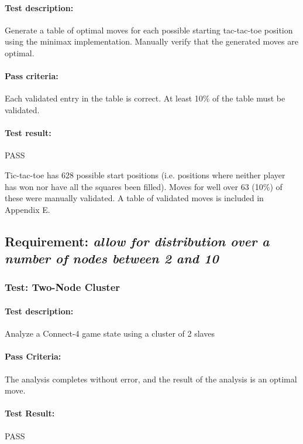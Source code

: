 \documentclass[pdftex,12pt,a4paper]{article}
\begin{document}
\paragraph{Test description:} Generate a table of optimal moves for each possible starting tac-tac-toe position using the minimax implementation. Manually verify that the generated moves are optimal.

\paragraph{Pass criteria:} Each validated entry in the table is correct. At least 10\% of the table must be validated.

\paragraph{Test result:} PASS

Tic-tac-toe has 628 possible start positions (i.e. positions where neither player has won nor have all the squares been filled). Moves for well over 63 (10\%) of these were manually validated. A table of validated moves is included in Appendix E.

\subsection{\textbf{Requirement:} \emph{allow for distribution over a number of nodes between 2 and 10}}

\subsubsection{\textbf{Test:} Two-Node Cluster}

\paragraph{Test description:} Analyze a Connect-4 game state using a cluster of 2 slaves

\paragraph{Pass Criteria:} The analysis completes without error, and the result of the analysis is an optimal move.

\paragraph{Test Result:} PASS
\end{document}
